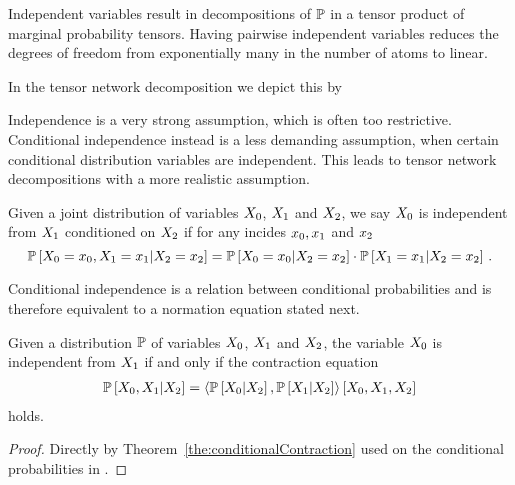 Independent variables result in decompositions of $\mathbb{P}$ in a tensor product of marginal probability tensors. 
Having pairwise independent variables reduces the degrees of freedom from exponentially many in the number of atoms to linear.

In the tensor network decomposition we depict this by
	\begin{center}
		
	\end{center}

Independence is a very strong assumption, which is often too restrictive.
Conditional independence instead is a less demanding assumption, when certain conditional distribution variables are independent. 
This leads to tensor network decompositions with a more realistic assumption.

\begin{definition}\label{def:condIndependence}
	Given a joint distribution of variables $X_{0}$, $X_{1}$ and $X_{2}$, we say $X_{0}$ is independent from $X_{1}$ conditioned on $X_{2}$ if for any incides $x_{0},x_{1}$ and $x_{2}$
		\[ \mathbb{P}\left[X_{0}=x_{0},X_{1}=x_{1}|X_{2}=x_{2}\right] 
		= \mathbb{P}\left[X_{0}=x_{0}|X_{2}=x_{2}\right] 
		\cdot \mathbb{P}\left[X_{1}=x_{1}|X_{2}=x_{2}\right]   \, . \]
\end{definition}

Conditional independence is a relation between conditional probabilities and is therefore equivalent to a normation equation stated next.

\begin{theorem}\label{the:condIndependenceProductCriterion}
	Given a distribution $\mathbb{P}$ of variables $X_{0}$, $X_{1}$ and $X_{2}$, the variable $X_{0}$ is independent from $X_{1}$ if and only if the contraction equation
	\begin{align*}
		 \mathbb{P}\left[X_{0},X_{1}|X_{2}\right] 
		 = \left\langle 
		 \mathbb{P}\left[X_{0}|X_{2}\right] ,\mathbb{P}\left[X_{1}|X_{2}\right] 
		 \right\rangle \left[ X_{0},X_{1},X_{2} \right]
	\end{align*}
	holds.
\end{theorem}
\begin{proof}
	Directly by Theorem~\ref{the:conditionalContraction} used on the conditional probabilities in .
\end{proof}

